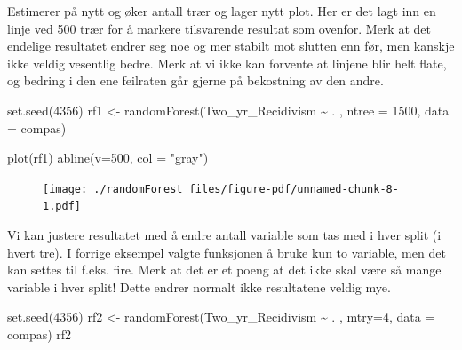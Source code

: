 \documentclass[
  letterpaper,
  DIV=11,
  numbers=noendperiod]{scrreprt}
\newenvironment{Shaded}{\begin{snugshade}}{\end{snugshade}}
\newcommand{\AttributeTok}[1]{\textcolor[rgb]{0.40,0.45,0.13}{#1}}
\newcommand{\DecValTok}[1]{\textcolor[rgb]{0.68,0.00,0.00}{#1}}
\newcommand{\FunctionTok}[1]{\textcolor[rgb]{0.28,0.35,0.67}{#1}}
\newcommand{\NormalTok}[1]{\textcolor[rgb]{0.00,0.23,0.31}{#1}}
\newcommand{\OtherTok}[1]{\textcolor[rgb]{0.00,0.23,0.31}{#1}}
\newcommand{\SpecialCharTok}[1]{\textcolor[rgb]{0.37,0.37,0.37}{#1}}
\newcommand{\StringTok}[1]{\textcolor[rgb]{0.13,0.47,0.30}{#1}}
\theoremstyle{definition}
\theoremstyle{remark}
\begin{document}
Estimerer på nytt og øker antall trær og lager nytt plot. Her er det
lagt inn en linje ved 500 trær for å markere tilsvarende resultat som
ovenfor. Merk at det endelige resultatet endrer seg noe og mer stabilt
mot slutten enn før, men kanskje ikke veldig vesentlig bedre. Merk at vi
ikke kan forvente at linjene blir helt flate, og bedring i den ene
feilraten går gjerne på bekostning av den andre.

\begin{Shaded}
\begin{Highlighting}[]
\FunctionTok{set.seed}\NormalTok{(}\DecValTok{4356}\NormalTok{)}
\NormalTok{rf1 }\OtherTok{\textless{}{-}} \FunctionTok{randomForest}\NormalTok{(Two\_yr\_Recidivism }\SpecialCharTok{\textasciitilde{}}\NormalTok{ . , }
                    \AttributeTok{ntree =} \DecValTok{1500}\NormalTok{, }
                   \AttributeTok{data =}\NormalTok{ compas)}

\FunctionTok{plot}\NormalTok{(rf1)}
\FunctionTok{abline}\NormalTok{(}\AttributeTok{v=}\DecValTok{500}\NormalTok{, }\AttributeTok{col =} \StringTok{"gray"}\NormalTok{)}
\end{Highlighting}
\end{Shaded}

\begin{figure}[H]

{\centering \texttt{[image: ./randomForest\_files/figure-pdf/unnamed-chunk-8-1.pdf]}

}

\end{figure}

Vi kan justere resultatet med å endre antall variable som tas med i hver
split (i hvert tre). I forrige eksempel valgte funksjonen å bruke kun to
variable, men det kan settes til f.eks. fire. Merk at det er et poeng at
det ikke skal være så mange variable i hver split! Dette endrer normalt
ikke resultatene veldig mye.

\begin{Shaded}
\begin{Highlighting}[]
\FunctionTok{set.seed}\NormalTok{(}\DecValTok{4356}\NormalTok{)}
\NormalTok{rf2 }\OtherTok{\textless{}{-}} \FunctionTok{randomForest}\NormalTok{(Two\_yr\_Recidivism }\SpecialCharTok{\textasciitilde{}}\NormalTok{ . , }
                    \AttributeTok{mtry=}\DecValTok{4}\NormalTok{,}
                    \AttributeTok{data =}\NormalTok{ compas)}
\NormalTok{rf2}
\end{Highlighting}
\end{Shaded}
\end{document}
